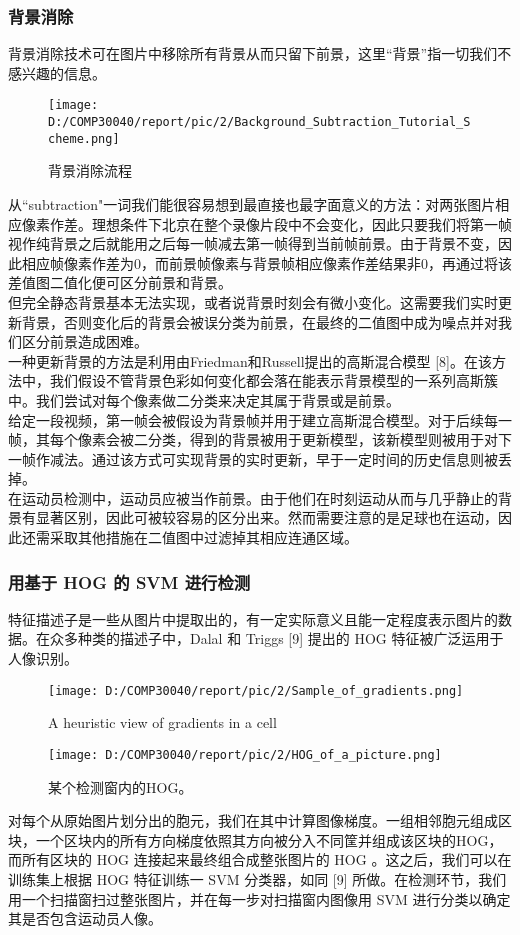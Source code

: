 \documentclass{article}
\begin{document}
\subsubsection{背景消除}
背景消除技术可在图片中移除所有背景从而只留下前景，这里“背景”指一切我们不感兴趣的信息。\\
\begin{figure}
  \centering
  \texttt{[image: D:/COMP30040/report/pic/2/Background\_Subtraction\_Tutorial\_Scheme.png]} 
  \caption{背景消除流程}
\end{figure}
从“subtraction"一词我们能很容易想到最直接也最字面意义的方法：对两张图片相应像素作差。理想条件下北京在整个录像片段中不会变化，因此只要我们将第一帧视作纯背景之后就能用之后每一帧减去第一帧得到当前帧前景。由于背景不变，因此相应帧像素作差为0，而前景帧像素与背景帧相应像素作差结果非0，再通过将该差值图二值化便可区分前景和背景。\\
但完全静态背景基本无法实现，或者说背景时刻会有微小变化。这需要我们实时更新背景，否则变化后的背景会被误分类为前景，在最终的二值图中成为噪点并对我们区分前景造成困难。\\
一种更新背景的方法是利用由Friedman和Russell提出的高斯混合模型 [8]。在该方法中，我们假设不管背景色彩如何变化都会落在能表示背景模型的一系列高斯簇中。我们尝试对每个像素做二分类来决定其属于背景或是前景。\\
给定一段视频，第一帧会被假设为背景帧并用于建立高斯混合模型。对于后续每一帧，其每个像素会被二分类，得到的背景被用于更新模型，该新模型则被用于对下一帧作减法。通过该方式可实现背景的实时更新，早于一定时间的历史信息则被丢掉。\\
在运动员检测中，运动员应被当作前景。由于他们在时刻运动从而与几乎静止的背景有显著区别，因此可被较容易的区分出来。然而需要注意的是足球也在运动，因此还需采取其他措施在二值图中过滤掉其相应连通区域。
\subsubsection{用基于 HOG 的 SVM 进行检测}
特征描述子是一些从图片中提取出的，有一定实际意义且能一定程度表示图片的数据。在众多种类的描述子中，Dalal 和 Triggs [9] 提出的 HOG 特征被广泛运用于人像识别。
\begin{figure}
  \centering
  \texttt{[image: D:/COMP30040/report/pic/2/Sample\_of\_gradients.png]}
  \caption{A heuristic view of gradients in a cell}
\end{figure}
\begin{figure}
  \centering
  \texttt{[image: D:/COMP30040/report/pic/2/HOG\_of\_a\_picture.png]} 
  \caption{某个检测窗内的HOG。}
\end{figure}
对每个从原始图片划分出的胞元，我们在其中计算图像梯度。一组相邻胞元组成区块，一个区块内的所有方向梯度依照其方向被分入不同筐并组成该区块的HOG，而所有区块的 HOG 连接起来最终组合成整张图片的 HOG 。这之后，我们可以在训练集上根据 HOG 特征训练一 SVM 分类器，如同 [9] 所做。在检测环节，我们用一个扫描窗扫过整张图片，并在每一步对扫描窗内图像用 SVM 进行分类以确定其是否包含运动员人像。
\end{document}
